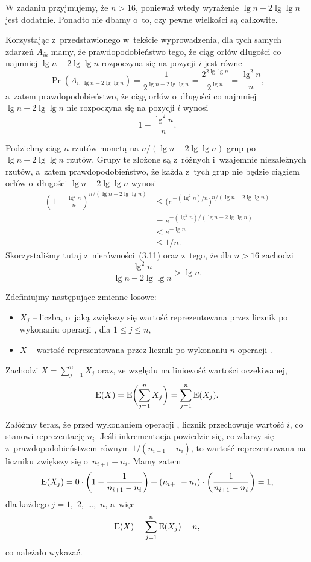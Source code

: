 \exercise %
W zadaniu przyjmujemy, że $n>16$, ponieważ wtedy wyrażenie $\lg n-2\lg\lg n$ jest dodatnie. Ponadto nie dbamy o~to, czy pewne wielkości są całkowite.

Korzystając z~przedstawionego w~tekście wyprowadzenia, dla tych samych zdarzeń $A_{ik}$ mamy, że prawdopodobieństwo tego, że ciąg orłów długości co najmniej $\lg n-2\lg\lg n$ rozpoczyna się na pozycji $i$ jest równe
\[
	\Pr(A_{i,\,\lg n-2\lg\lg n}) = \frac{1}{2^{\lg n-2\lg\lg n}} = \frac{2^{2\lg\lg n}}{2^{\lg n}} = \frac{\lg^2n}{n},
\]
a~zatem prawdopodobieństwo, że ciąg orłów o~długości co najmniej $\lg n-2\lg\lg n$ nie rozpoczyna się na pozycji $i$ wynosi
\[
	1-\frac{\lg^2n}{n}.
\]

Podzielmy ciąg $n$ rzutów monetą na $n/(\lg n-2\lg\lg n)$ grup po $\lg n-2\lg\lg n$ rzutów. Grupy te złożone są z~różnych i~wzajemnie niezależnych rzutów, a~zatem prawdopodobieństwo, że każda z~tych grup nie będzie ciągiem orłów o~długości $\lg n-2\lg\lg n$ wynosi
\begin{align*}
	\left(1-\frac{\lg^2n}{n}\right)^{n/(\lg n-2\lg\lg n)} &\le \bigl(e^{-(\lg^2n)/n}\bigr)^{n/(\lg n-2\lg\lg n)} \\
	&= e^{-(\lg^2n)/(\lg n-2\lg\lg n)} \\
	&< e^{-\lg n} \\
	&\le 1/n.
\end{align*}
Skorzystaliśmy tutaj z~nierówności~(3.11) oraz z~tego, że dla $n>16$ zachodzi
\[
	\frac{\lg^2n}{\lg n-2\lg\lg n} > \lg n.
\]

\problems


\subproblem %
Zdefiniujmy następujące zmienne losowe:
\begin{itemize}
	\item $X_j$ -- liczba, o~jaką zwiększy się wartość reprezentowana przez licznik po  wykonaniu operacji , dla $1\le j\le n$,
	\item $X$ -- wartość reprezentowana przez licznik po wykonaniu $n$ operacji .
\end{itemize}
Zachodzi $X=\sum_{j=1}^nX_j$ oraz, ze względu na liniowość wartości oczekiwanej,
\[
	\operatorname{E}(X) = \operatorname{E}\biggl(\sum_{j=1}^nX_j\biggr) = \sum_{j=1}^n\operatorname{E}(X_j).
\]

Załóżmy teraz, że przed wykonaniem  operacji , licznik przechowuje wartość $i$, co stanowi reprezentację $n_i$. Jeśli inkrementacja powiedzie się, co zdarzy się z~prawdopodobieństwem równym $1/(n_{i+1}-n_i)$, to wartość reprezentowana na liczniku zwiększy się o~$n_{i+1}-n_i$. Mamy zatem
\[
	\operatorname{E}(X_j) = 0\cdot\left(1-\frac{1}{n_{i+1}-n_i}\right)+(n_{i+1}-n_i)\cdot\left(\frac{1}{n_{i+1}-n_i}\right) = 1,
\]
dla każdego $j=1$,~2,~\dots,~$n$, a~więc
\[
	\operatorname{E}(X) = \sum_{j=1}^n\operatorname{E}(X_j) = n,
\]
co należało wykazać.


